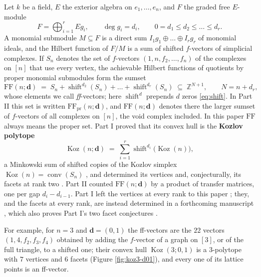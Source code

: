 \documentclass[11pt, a4paper, abstract=yes]{scrartcl}
\theoremstyle{definition}
\theoremstyle{remark}
\theoremstyle{plain}
\newcommand{\vek}[1]{\boldsymbol{#1}}
\theoremstyle{remark}
\theoremstyle{plain}
\newcommand{\Koz}{\operatorname{Koz}}
\newcommand{\shift}{\operatorname{shift}}
\newcommand{\conv}{\operatorname{conv}}
\newcommand{\FF}{\mathrm{FF}}
\begin{document}
Let \(k\) be a field, \(E\) the exterior algebra on \(e_1,\dots,e_n\), and \(F\) the graded free
\(E\)-module
\begin{equation}\label{eq:F}
  F=\bigoplus_{i=1}^rEg_i,\qquad \deg g_i=d_i,\qquad 0=d_1\le d_2\le\dots\le d_r .
\end{equation}
A monomial
submodule \(M\subseteq F\) is a direct sum \(I_1g_1\oplus\dots\oplus I_rg_r\) of monomial ideals,
and the Hilbert function of \(F/M\) is a sum of shifted \(f\)-vectors of simplicial complexes. If
\(S_n\) denotes the set of \(f\)-vectors \((1,n,f_2,\dots,f_n)\) of the complexes on \([n]\) that
use every vertex, the achievable Hilbert functions of quotients by proper monomial submodules form
the sumset
\begin{equation}\label{eq:ff}
  \FF(n;\vek d)\;=\;S_n+\shift^{d_2}(S_n)+\dots+\shift^{d_r}(S_n)\;\subseteq\;\mathbb Z^{N+1},
  \qquad N=n+d_r ,
\end{equation}
whose elements we call \emph{ff}-vectors; here \(\shift^d\) prepends \(d\) zeros \eqref{eq:shift}. In Part II this set is written \(\FF_{\mathrm{pr}}(n;\vek d)\),
and \(\FF(n;\vek d)\) denotes there the larger sumset of \(f\)-vectors of all complexes on \([n]\),
the void complex included. In this paper \(\FF\) always means the proper set. Part I
\autocite{SnellmanArticle1} proved that its convex hull is the \textbf{Kozlov polytope}
\begin{equation}\label{eq:koz}
  \Koz(n;\vek d)\;=\;\sum_{i=1}^r\shift^{d_i}\bigl(\Koz(n)\bigr),
\end{equation}
a Minkowski sum of shifted copies of the Kozlov simplex \(\Koz(n)=\conv(S_n)\)
\autocite[Theorem 39]{SnellmanArticle1}, and determined its vertices and, conjecturally, its facets
at rank two \autocite[Section 9]{SnellmanArticle1}. Part II \autocite{SnellmanArticle2} counted
\(\FF(n;\vek d)\) by a product of transfer matrices, one per gap \(d_i-d_{i-1}\). Part I left the
vertices at every rank to this paper \autocite[Section 9.3]{SnellmanArticle1}; they, and the facets at
every rank, are instead determined in a forthcoming manuscript \autocite{SnellmanArticle4}, which also
proves Part I's two facet conjectures \autocite[Conjectures 52 and 55]{SnellmanArticle1}.

For example, for \(n=3\) and \(\vek d=(0,1)\) the ff-vectors are the \(22\) vectors
\((1,4,f_2,f_3,f_4)\) obtained by adding the \(f\)-vector of a graph on \([3]\), or of the full
triangle, to a shifted one; their convex hull \(\Koz(3;0,1)\) is a \(3\)-polytope with \(7\) vertices and
\(6\) facets (Figure \ref{fig:koz3-d01}), and every one of its lattice points is an ff-vector.
\end{document}
